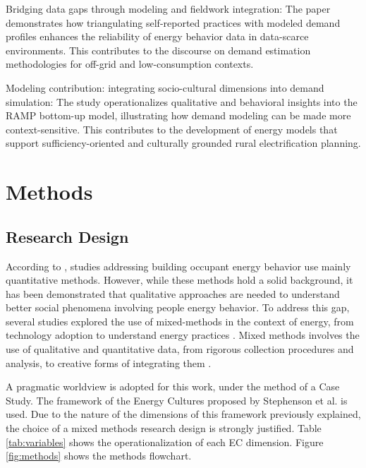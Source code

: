 \documentclass[final,3p,times,onecolumn]{elsarticle}
\begin{document}
\begin{itemize}
\begin{itemize}
    Bridging data gaps through modeling and fieldwork integration:
    The paper demonstrates how triangulating self-reported practices with modeled demand profiles enhances the reliability of energy behavior data in data-scarce environments. This contributes to the discourse on demand estimation methodologies for off-grid and low-consumption contexts.
    
    Modeling contribution: integrating socio-cultural dimensions into demand simulation:
    The study operationalizes qualitative and behavioral insights into the RAMP bottom-up model, illustrating how demand modeling can be made more context-sensitive. This contributes to the development of energy models that support sufficiency-oriented and culturally grounded rural electrification planning.
    \end{itemize}

\end{itemize}

\section{Methods}
\label{sec:methodology} 
\subsection{Research Design}
\label{sec:research_design}
According to \cite{zou_mixed_2018}, studies addressing building occupant energy behavior use mainly quantitative methods. However, while these methods hold a solid background, it has been demonstrated that qualitative approaches are needed to understand better social phenomena involving people energy behavior. To address this gap, several studies explored the use of mixed-methods in the context of energy, from technology adoption \cite{university_of_augsburg_adoption_2019, palm_peer_2017} to understand energy practices \cite{rosenberg_evidence_2019, guerra-santin_mixed_2016, wolff_tackling_2017}. Mixed methods involves the use of qualitative and quantitative data, from rigorous collection procedures and analysis, to creative forms of integrating them \cite{creswell_research_nodate}. 

A pragmatic worldview is adopted for this work, under the method of a Case Study. The framework of the Energy Cultures proposed by Stephenson et al. \cite{stephenson_energy_2010} is used. Due to the nature of the dimensions of this framework previously explained, the choice of a mixed methods research design is strongly justified. Table \ref{tab:variables} shows the operationalization of each \ac{EC} dimension. Figure \ref{fig:methods} shows the methods flowchart.
\end{document}
